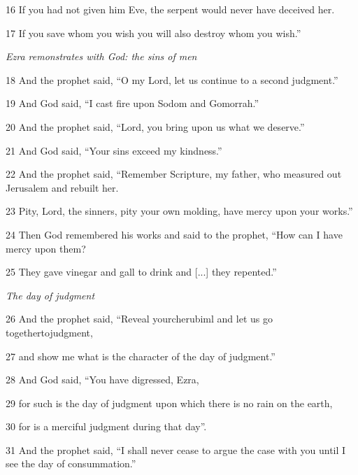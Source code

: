 \par 16 If you had not given him Eve, the serpent would never have deceived her.

\par 17 If you save whom you wish you will also destroy whom you wish.”

\par \textit{Ezra remonstrates with God: the sins of men}

\par 18 And the prophet said, “O my Lord, let us continue to a second judgment.”

\par 19 And God said, “I cast fire upon Sodom and Gomorrah.” 

\par 20 And the prophet said, “Lord, you bring upon us what we deserve.”

\par 21 And God said, “Your sins exceed my kindness.”

\par 22 And the prophet said, “Remember Scripture, my father, who measured out Jerusalem and rebuilt her.

\par 23 Pity, Lord, the sinners, pity your own molding, have mercy upon your works.”

\par 24 Then God remembered his works and said to the prophet, “How can I have mercy upon them?

\par 25 They gave vinegar and gall to drink and [...] they repented.”

\par \textit{The day of judgment}

\par 26 And the prophet said, “Reveal yourcherubiml and let us go togethertojudgment,

\par 27 and show me what is the character of the day of judgment.” 

\par 28 And God said, “You have digressed, Ezra,

\par 29 for such is the day of judgment upon which there is no rain on the earth,

\par 30 for is a merciful judgment during that day”. 

\par 31 And the prophet said, “I shall never cease to argue the case with you until I see the day of consummation.”

